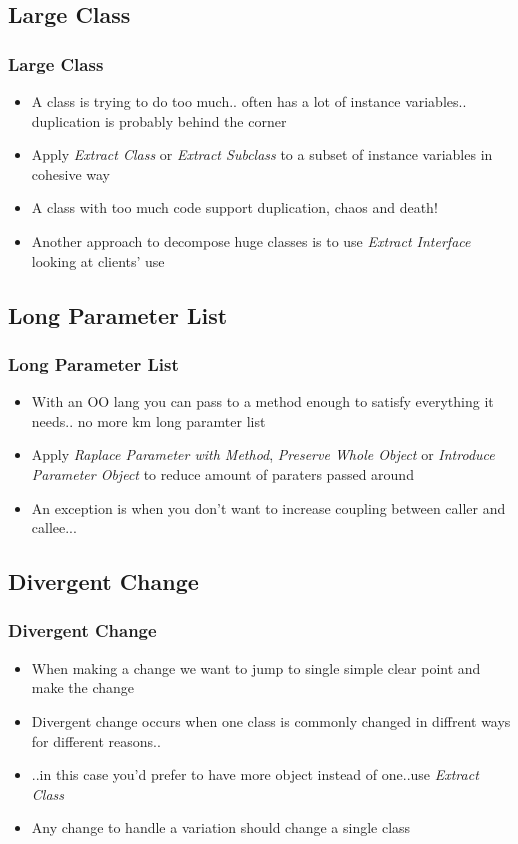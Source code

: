 \documentclass{beamer}
\begin{document}
\subsection{Large Class}
\begin{frame}
  \frametitle{Large Class}
  \begin{itemize}
	\item<+-> A class is trying to do too much.. often has a lot of instance variables.. duplication is probably behind the corner 
	\item<+-> Apply \textit{Extract Class} or \textit{Extract Subclass} to a subset of instance variables in cohesive way
	\item<+-> A class with too much code support duplication, chaos and death!
	\item<+-> Another approach to decompose huge classes is to use \textit{Extract Interface} looking at clients' use
  \end{itemize}
\end{frame}
  
\subsection{Long Parameter List}
\begin{frame}
  \frametitle{Long Parameter List}
  \begin{itemize}
	\item<+-> With an OO lang you can pass to a method enough to satisfy everything it needs.. no more km long paramter list 
	\item<+-> Apply \textit{Raplace Parameter with Method}, \textit{Preserve Whole Object} or \textit{Introduce Parameter Object} to reduce amount of paraters passed around
	\item<+-> An exception is when you don't want to increase coupling between caller and callee...
  \end{itemize}
\end{frame}

\subsection{Divergent Change}
\begin{frame}
  \frametitle{Divergent Change}
  \begin{itemize}
	\item<+-> When making a change we want to jump to single simple clear point and make the change
	\item<+-> Divergent change occurs when one class is commonly changed in diffrent ways for different reasons..
	\item<+-> ..in this case you'd prefer to have more object instead of one..use \textit{Extract Class}
	\item<+-> Any change to handle a variation should change a single class
  \end{itemize}
\end{frame}
\end{document}
